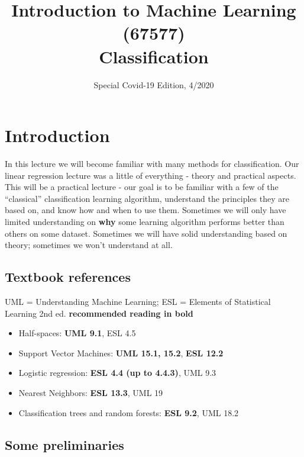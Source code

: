 \documentclass[11pt]{article}
\title{{\large{Introduction to Machine Learning (67577) \\
\vphantom{} Classification}}}
\date{Special Covid-19 Edition, 4/2020}
\begin{document}
\maketitle

\tableofcontents
\pagebreak



\section{Introduction}


In this lecture we will become familiar with many methods for classification.
Our linear regression lecture was a little of everything - theory and practical
aspects. This will be a practical lecture - our goal is to be familiar with a
few of the ``classical'' classification learning algorithm, understand the
principles they are based on, and know how and when to use them. Sometimes we
will only have limited understanding on {\bf why} some learning algorithm performs better than others
on some dataset. Sometimes we will have solid understanding based on theory; sometimes
we won't understand at all. 

\subsection{Textbook references}
UML = Understanding Machine Learning; ESL = Elements of Statistical Learning 2nd
ed. {\bf recommended reading in bold}

\begin{itemize}
  \item Half-spaces: {\bf UML 9.1}, ESL 4.5
  \item Support Vector Machines: {\bf UML 15.1, 15.2}, {\bf ESL 12.2}
  \item Logistic regression: {\bf ESL 4.4 (up to 4.4.3)}, UML 9.3
  \item Nearest Neighbors: {\bf ESL 13.3}, UML 19
  \item Classification trees and random forests: {\bf ESL 9.2}, UML 18.2
\end{itemize}

\subsection{Some preliminaries}
\end{document}
